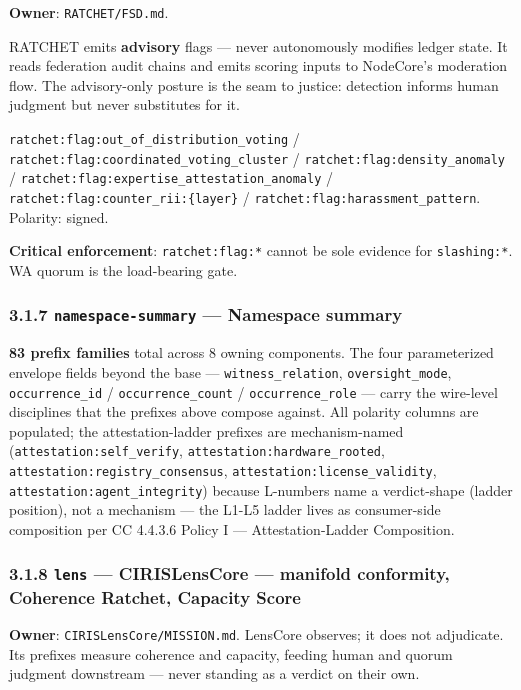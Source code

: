 \documentclass[11pt]{article}
\begin{document}
\textbf{Owner}: \texttt{RATCHET/FSD.md}.


RATCHET emits \textbf{advisory} flags — never autonomously modifies ledger state. It reads federation audit chains and emits scoring inputs to NodeCore's moderation flow. The advisory-only posture is the seam to justice: detection informs human judgment but never substitutes for it.


\texttt{ratchet:flag:out\_of\_distribution\_voting} / \texttt{ratchet:flag:coordinated\_voting\_cluster} / \texttt{ratchet:flag:density\_anomaly} / \texttt{ratchet:flag:expertise\_attestation\_anomaly} / \texttt{ratchet:flag:counter\_rii:\{layer\}} / \texttt{ratchet:flag:harassment\_pattern}. Polarity: signed.


\textbf{Critical enforcement}: \texttt{ratchet:flag:*} cannot be sole evidence for \texttt{slashing:*}. WA quorum is the load-bearing gate.


\subsubsection*{3.1.7 \texttt{namespace-summary} — Namespace summary}


\textbf{83 prefix families} total across 8 owning components. The four parameterized envelope fields beyond the base — \texttt{witness\_relation}, \texttt{oversight\_mode}, \texttt{occurrence\_id} / \texttt{occurrence\_count} / \texttt{occurrence\_role} — carry the wire-level disciplines that the prefixes above compose against. All polarity columns are populated; the attestation-ladder prefixes are mechanism-named (\texttt{attestation:self\_verify}, \texttt{attestation:hardware\_rooted}, \texttt{attestation:registry\_consensus}, \texttt{attestation:license\_validity}, \texttt{attestation:agent\_integrity}) because L-numbers name a verdict-shape (ladder position), not a mechanism — the L1-L5 ladder lives as consumer-side composition per CC 4.4.3.6 Policy I — Attestation-Ladder Composition.


\subsubsection*{3.1.8 \texttt{lens} — CIRISLensCore — manifold conformity, Coherence Ratchet, Capacity Score}


\textbf{Owner}: \texttt{CIRISLensCore/MISSION.md}. LensCore observes; it does not adjudicate. Its prefixes measure coherence and capacity, feeding human and quorum judgment downstream — never standing as a verdict on their own.
\end{document}
